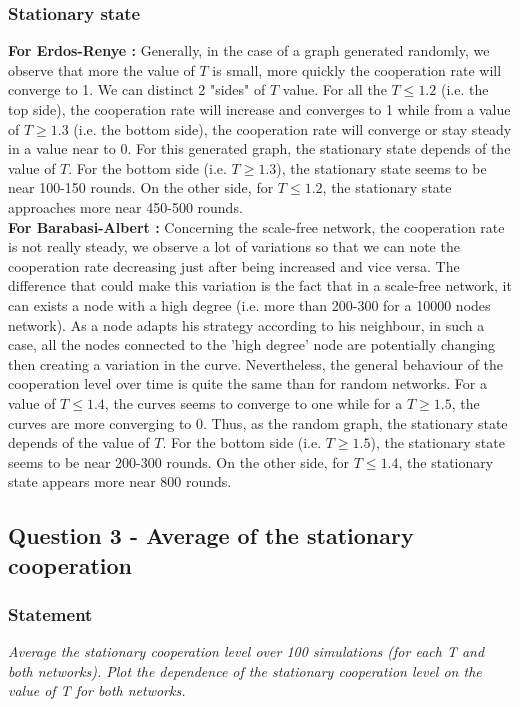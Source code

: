 \documentclass{article}
\begin{document}
\subsubsection{Stationary state}
\textbf{For Erdos-Renye :} Generally, in the case of a graph generated randomly, we observe that more the value of $T$ is small, more quickly the cooperation rate will converge to 1.  We can distinct 2 "sides" of $T$ value. For all the $T \le 1.2$ (i.e. the top side), the cooperation rate will increase and converges to 1 while from a value of $T \ge 1.3$ (i.e. the bottom side), the cooperation rate will converge or stay steady in a value near to 0. For this generated graph, the stationary state depends of the value of $T$. For the bottom side (i.e. $T \ge 1.3$), the stationary state seems to be near 100-150 rounds. On the other side, for $T \le 1.2$, the stationary state approaches more near 450-500 rounds. \\

\noindent
\textbf{For Barabasi-Albert :} Concerning the scale-free network, the cooperation rate is not really steady, we observe a lot of variations so that we can note the cooperation rate decreasing just after being increased and vice versa. The difference that could make this variation is the fact that in a scale-free network, it can exists a node with a high degree (i.e. more than 200-300 for a 10000 nodes network). As a node adapts his strategy according to his neighbour, in such a case, all the nodes connected to the 'high degree' node are potentially changing then creating a variation in the curve. Nevertheless, the general behaviour of the cooperation level over time is quite the same than for random networks. For a value of $T \le 1.4$, the curves seems to converge to one while for a $T \ge 1.5$, the curves are more converging to 0. Thus, as the random graph, the stationary state depends of the value of $T$. For the bottom side (i.e. $T \ge 1.5$), the stationary state seems to be near 200-300 rounds. On the other side, for $T \le 1.4$, the stationary state appears more near 800 rounds.  

\subsection{Question 3 - Average of the stationary cooperation}

\subsubsection*{Statement}
\textit{Average the stationary cooperation level over 100 simulations (for each T and both networks). Plot the dependence of the stationary cooperation level on the value of T for both networks.}
\end{document}
